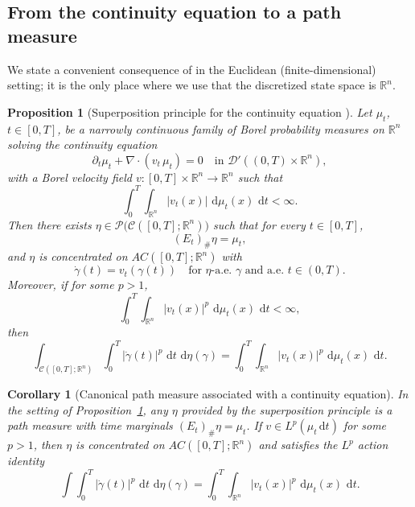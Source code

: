 \documentclass{article}
\numberwithin{equation}{section}
\theoremstyle{plain}
\newtheorem{proposition}[theorem]{Proposition}
\newtheorem{corollary}[theorem]{Corollary}
\theoremstyle{definition}
\theoremstyle{remark}
\newcommand{\R}{\mathbb{R}}
\newcommand{\Pcal}{\mathcal{P}}
\newcommand{\Ccal}{\mathcal{C}}
\newcommand{\Dcal}{\mathcal{D}}
\newcommand{\dd}{\,\mathrm{d}}
\begin{document}
\subsection{From the continuity equation to a path measure}

We state a convenient consequence of \cite[Proposition~8.1.8]{ambrosio2004gradient} in the Euclidean (finite-dimensional)
setting; it is the only place where we use that the discretized state space is $\R^n$.

\begin{proposition}[Superposition principle for the continuity equation {\cite[Prop.~8.1.8]{ambrosio2004gradient}}]
\label{prop:ambrosio-representation}
Let $\mu_t$, $t\in[0,T]$, be a narrowly continuous family of Borel probability measures on $\R^n$ solving the continuity
equation
\[
\partial_t\mu_t+\nabla\cdot(v_t\,\mu_t)=0
\quad\text{in }\Dcal'((0,T)\times\R^n),
\]
with a Borel velocity field $v:[0,T]\times\R^n\to\R^n$ such that
\[
\int_0^T\int_{\R^n}|v_t(x)|\,\dd\mu_t(x)\,\dd t<\infty.
\]
Then there exists $\eta\in\Pcal\big(\Ccal([0,T];\R^n)\big)$ such that for every $t\in[0,T]$,
\[
(E_t)_\#\eta=\mu_t,
\]
and $\eta$ is concentrated on $AC([0,T];\R^n)$ with
\[
\dot\gamma(t)=v_t(\gamma(t))\quad\text{for }\eta\text{-a.e.\ }\gamma\text{ and a.e.\ }t\in(0,T).
\]
Moreover, if for some $p>1$,
\[
\int_0^T\int_{\R^n}|v_t(x)|^p\,\dd\mu_t(x)\,\dd t<\infty,
\]
then
\[
\int_{\Ccal([0,T];\R^n)}\int_0^T |\dot\gamma(t)|^p\,\dd t\,\dd\eta(\gamma)
=
\int_0^T\int_{\R^n}|v_t(x)|^p\,\dd\mu_t(x)\,\dd t.
\]
\end{proposition}

\begin{corollary}[Canonical path measure associated with a continuity equation]
\label{cor:path-measure-from-CE}
In the setting of Proposition~\ref{prop:ambrosio-representation}, any $\eta$ provided by the superposition principle is a
path measure with time marginals $(E_t)_\#\eta=\mu_t$. If $v\in L^p(\mu_t\dd t)$ for some $p>1$, then $\eta$ is
concentrated on $AC([0,T];\R^n)$ and satisfies the $L^p$ action identity
\[
\int\!\!\int_0^T |\dot\gamma(t)|^p\,\dd t\,\dd\eta(\gamma)
=
\int_0^T\int_{\R^n}|v_t(x)|^p\,\dd\mu_t(x)\,\dd t.
\]
\end{corollary}
\end{document}

